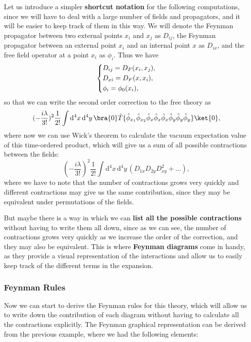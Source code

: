 Let us introduce a simpler \textbf{shortcut notation} for the following computations, since we will have to deal with a large number of fields and propagators, and it will be easier to keep track of them in this way. We will denote the Feynman propagator between two external points \(x_i\) and \(x_j\) as \(D_{ij}\), the Feynman propagator between an external point \(x_i\) and an internal point \(x\) as \(D_{ix}\), and the free field operator at a point \(x_i\) as \(\phi_i\). Thus we have
\[
    \begin{dcases}
        D_{ij} = D_F (x_i, x_j), \\
        D_{xi} = D_F (x, x_i),   \\
        \phi_i = \phi_0 (x_i),
    \end{dcases}
\]
so that we can write the second order correction to the free theory as
\[
    (-\frac{i \lambda}{3!})^2 \frac{1}{2!} \int \mathrm{d}^4 x \, \mathrm{d}^4 y \, \bra{0} \hat{T} \{ \hat{\phi}_{x_1} \hat{\phi}_{x_2} \hat{\phi}_{x} \hat{\phi}_{x} \hat{\phi}_{x} \hat{\phi}_{y} \hat{\phi}_{y} \hat{\phi}_{y}\} \ket{0},
\]
where now we can use Wick's theorem to calculate the vacuum expectation value of this time-ordered product, which will give us a sum of all possible contractions between the fields:
\[
    (-\frac{i \lambda}{3!})^2 \frac{1}{2!} \int \mathrm{d}^4 x \, \mathrm{d}^4 y \, ( D_{1 x} D_{2 y} D_{x y}^2 + \dots),
\]
where we have to note that the number of contractions grows very quickly and different contractions may give us the same contribution, since they may be equivalent under permutations of the fields.

But maybe there is a way in which we can \textbf{list all the possible contractions} without having to write them all down, since as we can see, the number of contractions grows very quickly as we increase the order of the correction, and they may also be equivalent. This is where \textbf{Feynman diagrams} come in handy, as they provide a visual representation of the interactions and allow us to easily keep track of the different terms in the expansion.

\subsubsection{Feynman Rules}
Now we can start to derive the Feynman rules for this theory, which will allow us to write down the contribution of each diagram without having to calculate all the contractions explicitly. The Feynman graphical representation can be derived from the previous example, where we had the following elements:


